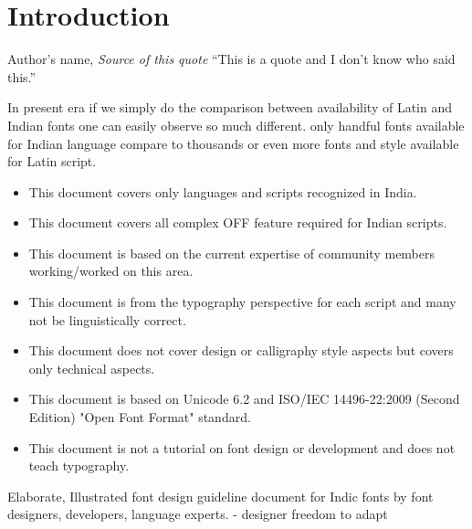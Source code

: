 \chapter{Introduction}

\begin{chapquote}{Author's name, \textit{Source of this quote}}
``This is a quote and I don't know who said this.''
\end{chapquote}


In present era if we simply do the comparison between availability of Latin and Indian fonts one can easily observe so much different. only handful fonts available for Indian language compare to thousands or even more fonts and style available for Latin script.



\begin{itemize}
\item This document covers only languages and scripts recognized in India.
\item This document covers all complex OFF feature required for Indian scripts.
\item This document is based on the current expertise of community members working/worked on this area.
\item This document is from the typography perspective for each script and many not be linguistically correct.
\item This document does not cover design or calligraphy style aspects but covers only technical aspects.
\item This document is based on Unicode 6.2 and ISO/IEC 14496-22:2009 (Second Edition) "Open Font Format" standard.
\item This document is not a tutorial on font design or development and does not teach typography.
\end{itemize}


Elaborate, Illustrated font design guideline document for Indic fonts by font designers, developers, language experts.
- designer freedom to adapt


